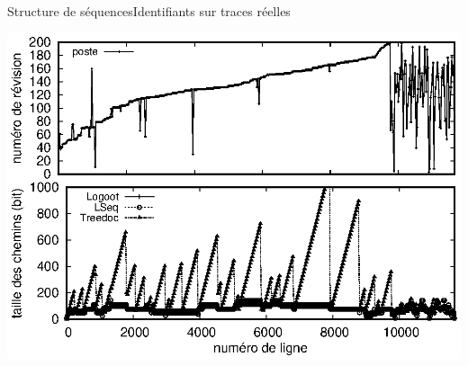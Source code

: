 \begin{frame}{Structure de séquences}{Identifiants sur traces réelles}

  \hspace{-1cm}
  \begin{minipage}{0.45\textwidth}
    \includegraphics[width=1.29\textwidth]{img/replication/poste.eps}
  \end{minipage}
  \hspace{1.2cm}
  \begin{minipage}{0.45\textwidth}
  \end{minipage}


\end{frame}


